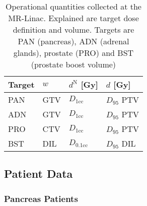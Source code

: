 \documentclass[\relativeRoot/ada.tex]{subfiles}
\begin{document}
\begin{table}[!htb]
    \centering
    \caption{Operational quantities collected at the MR-Linac. Explained are target dose definition and volume. Targets are PAN (pancreas), ADN (adrenal glands), prostate (PRO) and BST (prostate boost volume)}
    \begin{tabular}{l|lll}
    \toprule
        Target & $w$ & $d^{\text{N}}$ [Gy] & $d$ [Gy] \\
    \midrule
       PAN & GTV & $D_{1\text{cc}}$   & $D_{95}$ PTV \\
       ADN & GTV & $D_{1\text{cc}}$   & $D_{95}$ PTV \\
       PRO & CTV & $D_{1\text{cc}}$   & $D_{95}$ PTV \\
       BST & DIL & $D_{0.1\text{cc}}$ & $D_{95}$ DIL \\
     
    \bottomrule
    \end{tabular}
    \label{tab:operational_quantity}
\end{table}

\subsection{Patient Data}

\subsubsection{Pancreas Patients}
\end{document}
